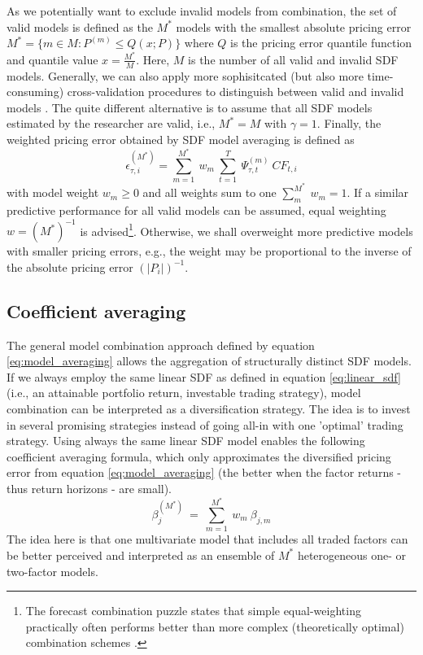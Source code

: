 \documentclass[12pt]{article}
\begin{document}
As we potentially want to exclude invalid models from combination, the set of valid models is defined as the $M^*$ models with the smallest absolute pricing error $M^*=\{m \in M: P^{(m)} \leq Q(x;P) \}$ where $Q$ is the pricing error quantile function and quantile value $x = \frac{M^*}{M}$.
Here, $M$ is the number of all valid and invalid SDF models.
Generally, we can also apply more sophisitcated (but also more time-consuming) cross-validation procedures to distinguish between valid and invalid models \citep{AC10}.
The quite different alternative is to assume that all SDF models estimated by the researcher are valid, i.e., $M^*=M$ with $\gamma=1$.
Finally, the weighted pricing error obtained by SDF model averaging is defined as
\begin{equation}
\label{eq:model_averaging}
\epsilon_{\tau, i}^{(M^*)} = 
\sum_{m=1}^{M^*} \  
w_m \
\sum_{t=1}^{T} \
\Psi_{\tau,t}^{(m)}\ 
{CF}_{t, i}
\end{equation}
with model weight $w_m \geq 0$ and all weights sum to one $\sum_m^{M^*}\ w_m=1$. 
If a similar predictive performance for all valid models can be assumed, equal weighting $w=(M^*)^{-1}$ is advised\footnote{The forecast combination puzzle states that simple equal-weighting practically often performs better than more complex (theoretically optimal) combination schemes \citep{SW09,CMVW16,QRCY19}.}. 
Otherwise, we shall overweight more predictive models with smaller pricing errors, e.g., the weight may be proportional to the inverse of the absolute pricing error $\left(\left|P_i\right|\right)^{-1}$.

\subsection{Coefficient averaging}
\label{sec:coef_averaging}

The general model combination approach defined by equation \ref{eq:model_averaging} allows the aggregation of structurally distinct SDF models.
If we always employ the same linear SDF as defined in equation \ref{eq:linear_sdf} (i.e., an attainable portfolio return, investable trading strategy), model combination can be interpreted as a diversification strategy.
The idea is to invest in several promising strategies instead of going all-in with one 'optimal' trading strategy.
Using always the same linear SDF model enables the following coefficient averaging formula, which only approximates the diversified pricing error from equation \ref{eq:model_averaging} (the better when the factor returns - thus return horizons - are small).
\begin{equation}
\label{eq:coef_averaging}
\beta_j^{(M^*)}\ =\ \sum_{m=1}^{M^*}\ w_m \ \beta_{j,m}
\end{equation}
The idea here is that one multivariate model that includes all traded factors can be better perceived and interpreted as an ensemble of $M^*$ heterogeneous one- or two-factor models.
\end{document}
